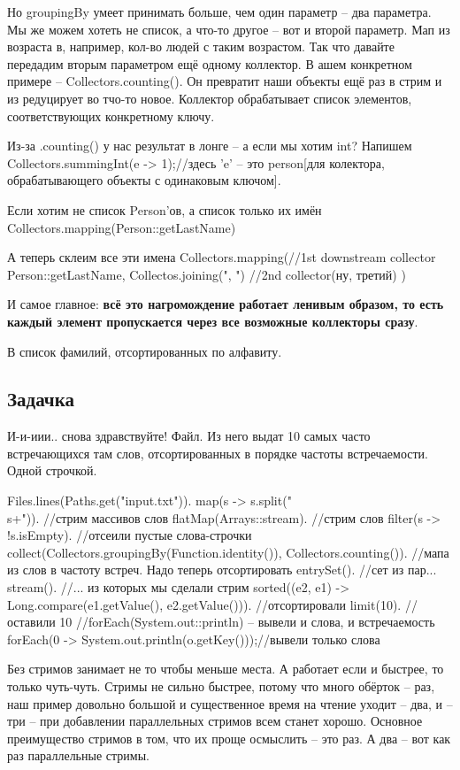 Но groupingBy умеет принимать больше, чем один параметр -- два параметра.%
Мы же можем хотеть не список, а что-то другое -- вот и второй параметр. Мап из возраста в, например, кол-во людей с таким возрастом.
Так что давайте передадим вторым параметром ещё одному коллектор. В ашем конкретном примере -- Collectors.counting(). Он превратит наши объекты ещё раз в стрим и из редуцирует во тчо-то новое.
Коллектор обрабатывает список элементов, соответствующих конкретному ключу.

Из-за .counting() у нас результат в лонге -- а если мы хотим int? Напишем Collectors.summingInt(e -> 1);//здесь 'e' -- это person[для колектора, обрабатывающего объекты с одинаковым ключом].

Если хотим не список Person'ов, а список только их имён
Collectors.mapping(Person::getLastName)

А теперь склеим все эти имена
Collectors.mapping(//1st downstream collector
Person::getLastName, 
Collectos.joining(", ") //2nd collector(ну, третий)
)

И самое главное: \textbf{всё это нагромождение работает ленивым образом, то есть каждый элемент пропускается через все возможные коллекторы сразу}.

В список фамилий, отсортированных по алфавиту.

\subsection{Задачка}
И-и-иии.. снова здравствуйте! Файл. Из него выдат 10 самых часто встречающихся там слов, отсортированных в порядке частоты встречаемости. Одной строчкой.
\begin{javacode}
Files.lines(Paths.get("input.txt")).
map(s -> s.split("\\s+")). //стрим массивов слов
flatMap(Arrays::stream). //стрим слов
filter(s -> !s.isEmpty). //отсеили пустые слова-строчки
collect(Collectors.groupingBy(Function.identity()), Collectors.counting()). //мапа из слов в частоту встреч. Надо теперь отсортировать
entrySet(). //сет из пар...
stream(). //... из которых мы сделали стрим
sorted((e2, e1) -> Long.compare(e1.getValue(), e2.getValue())). //отсортировали
limit(10). //оставили 10
//forEach(System.out::println) -- вывели и слова, и встречаемость
forEach(0 -> System.out.println(o.getKey()));//вывели только слова
\end{javacode}
Без стримов занимает не то чтобы меньше места. %
А работает если и быстрее, то только чуть-чуть. Стримы не сильно быстрее, потому что много обёрток -- раз, наш пример довольно большой и существенное время на чтение уходит -- два, и -- три -- при добавлении параллельных стримов всем станет хорошо.
Основное преимущество стримов в том, что их проще осмыслить -- это раз. А два -- вот как раз параллельные стримы.
